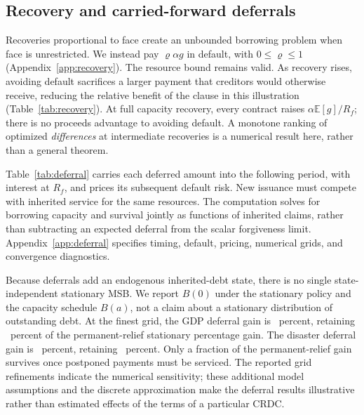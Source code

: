 \documentclass[11pt]{article}
\newcommand{\E}{\mathbb E}
\newcommand{\FitTable}[1]{\sbox{\tablebox}{#1}\ifdim\wd\tablebox>\linewidth\resizebox{\linewidth}{!}{\usebox{\tablebox}}\else\usebox{\tablebox}\fi}
\begin{document}
\subsection{Recovery and carried-forward deferrals}\label{subsec:recovery}
\begin{table}[t]
\centering\caption{Recovery as a share $\varrho$ of capacity in default, stress case. All contracts receive the same recovery rule.}\label{tab:recovery}

\end{table}
Recoveries proportional to face create an unbounded borrowing problem when face is unrestricted. We instead pay $\varrho\alpha g$ in default, with $0\le\varrho\le1$ (Appendix~\ref{app:recovery}). The resource bound remains valid. As recovery rises, avoiding default sacrifices a larger payment that creditors would otherwise receive, reducing the relative benefit of the clause in this illustration (Table~\ref{tab:recovery}). At full capacity recovery, every contract raises $\alpha\E[g]/R_f$; there is no proceeds advantage to avoiding default. A monotone ranking of optimized \emph{differences} at intermediate recoveries is a numerical result here, rather than a general theorem.

\begin{table}[t]
\centering\caption{NPV-neutral deferrals under a stationary issuance policy, stress case. $B(0)$ is new borrowing capacity with no inherited deferred claim. Gains use the straight-debt control at the same discretization. ``Retained'' is this percentage gain divided by the corresponding permanent-relief stationary percentage gain. Residual is the undamped fixed-point update error; it is not a discretization error bound.}\label{tab:deferral}
\FitTable{}
\end{table}
Table~\ref{tab:deferral} carries each deferred amount into the following period, with interest at $R_f$, and prices its subsequent default risk. New issuance must compete with inherited service for the same resources. The computation solves for borrowing capacity and survival jointly as functions of inherited claims, rather than subtracting an expected deferral from the scalar forgiveness limit. Appendix~\ref{app:deferral} specifies timing, default, pricing, numerical grids, and convergence diagnostics.

Because deferrals add an endogenous inherited-debt state, there is no single state-independent stationary MSB. We report $B(0)$ under the stationary policy and the capacity schedule $B(a)$, not a claim about a stationary distribution of outstanding debt. At the finest grid, the GDP deferral gain is \DeferralGDPGain\ percent, retaining \DeferralGDPRetained\ percent of the permanent-relief stationary percentage gain. The disaster deferral gain is \DeferralDisasterGain\ percent, retaining \DeferralDisasterRetained\ percent. Only a fraction of the permanent-relief gain survives once postponed payments must be serviced. The reported grid refinements indicate the numerical sensitivity; these additional model assumptions and the discrete approximation make the deferral results illustrative rather than estimated effects of the terms of a particular CRDC.
\end{document}
